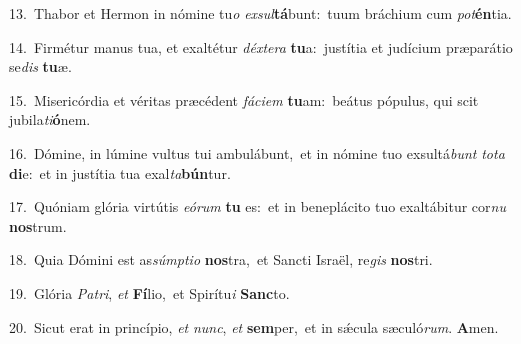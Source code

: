 {\numbfont\textcolor{\numbcolor}{13.}}~Thabor et Hermon in nómine tu\textit{o} \textit{ex}\-\textit{sul}\textbf{tá}bunt:~\star tuum bráchium cum \textit{pot}\-\textbf{én}tia.\par
{\numbfont\textcolor{\numbcolor}{14.}}~Firmétur manus tua, et exaltétur \textit{déx}\-\textit{te}\textit{ra} \textbf{tu}\-a:~\star justítia et judícium præparátio se\textit{dis} \textbf{tu}\-æ.\par
{\numbfont\textcolor{\numbcolor}{15.}}~Misericórdia et véritas præcédent \textit{fá}\-\textit{ci}\textit{em} \textbf{tu}\-am:~\star beátus pópulus, qui scit jubila\-\textit{ti}\-\textbf{ó}nem.\par
{\numbfont\textcolor{\numbcolor}{16.}}~Dómine, in lúmine vultus tui ambulábunt,~\dagger et in nómine tuo exsultá\textit{bunt} \textit{to}\-\textit{ta} \textbf{di}\-e:~\star et in justítia tua exal\-\textit{ta}\-\textbf{bún}tur.\par
{\numbfont\textcolor{\numbcolor}{17.}}~Quóniam glória virtútis \textit{e}\-\textit{ó}\textit{rum} \textbf{tu} es:~\star et in beneplácito tuo exaltábitur cor\textit{nu} \textbf{nos}\-trum.\par
{\numbfont\textcolor{\numbcolor}{18.}}~Quia Dómini est as\-\textit{súmp}\-\textit{ti}\textit{o} \textbf{nos}\-tra,~\star et Sancti Israël, re\textit{gis} \textbf{nos}\-tri.\par
{\numbfont\textcolor{\numbcolor}{19.}}~Glória \textit{Pa}\-\textit{tri}, \textit{et} \textbf{Fí}\-lio,~\star et Spirítu\textit{i} \textbf{Sanc}\-to.\par
{\numbfont\textcolor{\numbcolor}{20.}}~Sicut erat in princípio, \textit{et} \textit{nunc}\-, \textit{et} \textbf{sem}\-per,~\star et in sǽcula sæculó\-\textit{rum}\-. \textbf{A}\-men.\par
